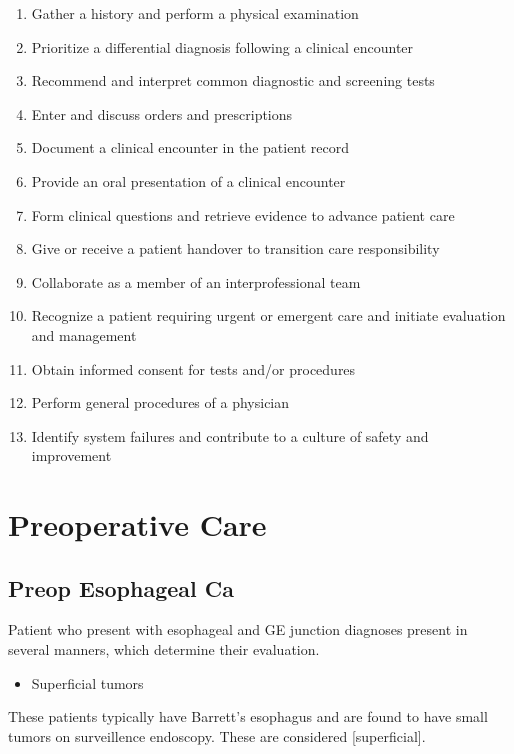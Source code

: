 \documentclass[
  letterpaper,
]{scrbook}
\providecommand{\tightlist}{%
  \setlength{\itemsep}{0pt}\setlength{\parskip}{0pt}}
\begin{document}
\begin{enumerate}
\def\labelenumi{\arabic{enumi}.}
\tightlist
\item
  Gather a history and perform a physical examination
\item
  Prioritize a differential diagnosis following a clinical encounter
\item
  Recommend and interpret common diagnostic and screening tests
\item
  Enter and discuss orders and prescriptions
\item
  Document a clinical encounter in the patient record
\item
  Provide an oral presentation of a clinical encounter
\item
  Form clinical questions and retrieve evidence to advance patient care
\item
  Give or receive a patient handover to transition care responsibility
\item
  Collaborate as a member of an interprofessional team
\item
  Recognize a patient requiring urgent or emergent care and initiate
  evaluation and management
\item
  Obtain informed consent for tests and/or procedures
\item
  Perform general procedures of a physician
\item
  Identify system failures and contribute to a culture of safety and
  improvement
\end{enumerate}

\part{Preoperative Care}

\chapter{Preop Esophageal Ca}\label{preop_esophageal}

Patient who present with esophageal and GE junction diagnoses present in
several manners, which determine their evaluation.

\begin{itemize}
\tightlist
\item
  Superficial tumors
\end{itemize}

These patients typically have Barrett's esophagus and are found to have
small tumors on surveillence endoscopy. These are considered
{[}superficial{]}.
\end{document}
